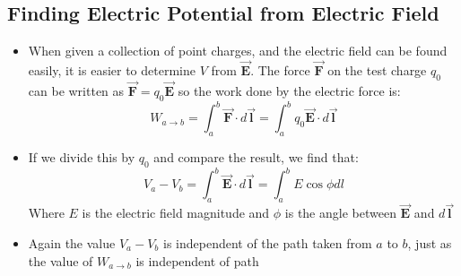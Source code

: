 \documentclass[11pt, a4paper]{article}
\begin{document}
\subsection{Finding Electric Potential from Electric Field}
\begin{itemize}
    \item When given a collection of point charges, and the electric field can be found
        easily, it is easier to determine $V$ from $\vec{\mathbf{E}}$. The force
        $\vec{\mathbf{F}}$ on the test charge $q_0$ can be written as
        $\vec{\mathbf{F}} = q_0 \vec{\mathbf{E}}$ so the work done by the electric force
        is:
        \begin{equation}
            W_{a\rightarrow b} = \int_{a}^{b} \vec{\mathbf{F}} \cdot d \vec{\mathbf{l}} =
            \int_{a}^{b} q_0\vec{\mathbf{E}} \cdot d \vec{\mathbf{l}}
        \end{equation}
    \item If we divide this by $q_0$ and compare the result, we find that:
        \begin{equation}
            V_a - V_b = \int_{a}^{b} \vec{\mathbf{E}} \cdot d \vec{\mathbf{l}} =
            \int_{a}^{b} E\cos\phi dl
        \end{equation}
        Where $E$ is the electric field magnitude and $\phi$ is the angle between
        $\vec{\mathbf{E}}$ and $d \vec{\mathbf{l}}$
    \item Again the value $V_a - V_b$ is independent of the path taken from $a$ to $b$,
        just as the value of $W_{a\rightarrow b}$ is independent of path
\end{itemize}
\end{document}
